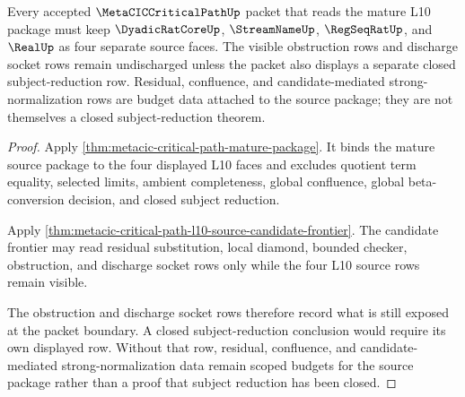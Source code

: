 \begin{theorem}
\label{thm:metacic-critical-path-mature-l10-source-socket-separation}
Every accepted $\MetaCICCriticalPathUp$ packet that reads the mature L10 package must keep $\DyadicRatCoreUp$, $\StreamNameUp$, $\RegSeqRatUp$, and $\RealUp$ as four separate source faces. The visible obstruction rows and discharge socket rows remain undischarged unless the packet also displays a separate closed subject-reduction row. Residual, confluence, and candidate-mediated strong-normalization rows are budget data attached to the source package; they are not themselves a closed subject-reduction theorem.
\end{theorem}
\begin{proof}
Apply \autoref{thm:metacic-critical-path-mature-package}. It binds the mature source package to the four displayed L10 faces and excludes quotient term equality, selected limits, ambient completeness, global confluence, global beta-conversion decision, and closed subject reduction.

Apply \autoref{thm:metacic-critical-path-l10-source-candidate-frontier}. The candidate frontier may read residual substitution, local diamond, bounded checker, obstruction, and discharge socket rows only while the four L10 source rows remain visible.

The obstruction and discharge socket rows therefore record what is still exposed at the packet boundary. A closed subject-reduction conclusion would require its own displayed row. Without that row, residual, confluence, and candidate-mediated strong-normalization data remain scoped budgets for the source package rather than a proof that subject reduction has been closed.
\end{proof}
